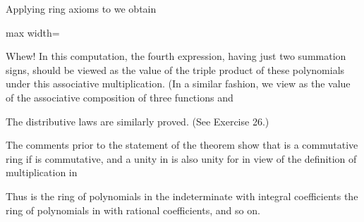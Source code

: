 \documentclass[11pt,oneside]{article}
\begin{document}
\begin{BookBody}

Applying ring axioms to  we obtain

\begin{center}\begin{adjustbox}{max width=\linewidth}\end{adjustbox}\end{center}

Whew! In this computation, the fourth expression, having just two summation signs, should be viewed as the value of the triple product  of these polynomials under this associative multiplication. (In a similar fashion, we view  as the value of the associative composition  of three functions  and 

The distributive laws are similarly proved. (See Exercise 26.)

The comments prior to the statement of the theorem show that  is a commutative ring if  is commutative, and a unity  in  is also unity for  in view of the definition of multiplication in \BookEnd{\blacklozenge}

Thus  is the ring of polynomials in the indeterminate  with integral coefficients the ring of polynomials in  with rational coefficients, and so on.


\end{BookBody}
\end{document}
